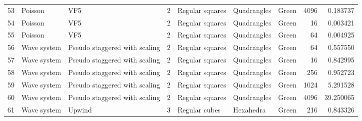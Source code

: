 \begin{tabular}{lllrlllrr}
53  &           Poisson &                            VF5 &               2 &                           Regular squares &            Quadrangles  &                                Green &                     4096 &                         0.183737 \\
54  &           Poisson &                            VF5 &               2 &                           Regular squares &            Quadrangles  &                                Green &                       16 &                         0.003421 \\
55  &           Poisson &                            VF5 &               2 &                           Regular squares &            Quadrangles  &                                Green &                       64 &                         0.004925 \\
56  &       Wave system &  Pseudo staggered with scaling &               2 &                           Regular squares &            Quadrangles  &                                Green &                       64 &                         0.557550 \\
57  &       Wave system &  Pseudo staggered with scaling &               2 &                           Regular squares &            Quadrangles  &                                Green &                       16 &                         0.842995 \\
58  &       Wave system &  Pseudo staggered with scaling &               2 &                           Regular squares &            Quadrangles  &                                Green &                      256 &                         0.952723 \\
59  &       Wave system &  Pseudo staggered with scaling &               2 &                           Regular squares &            Quadrangles  &                                Green &                     1024 &                         5.291528 \\
60  &       Wave system &  Pseudo staggered with scaling &               2 &                           Regular squares &            Quadrangles  &                                Green &                     4096 &                        39.250065 \\
61  &       Wave system &                         Upwind &               3 &                             Regular cubes &              Hexahedra  &                                Green &                      216 &                         0.843326 \\

\end{tabular}
